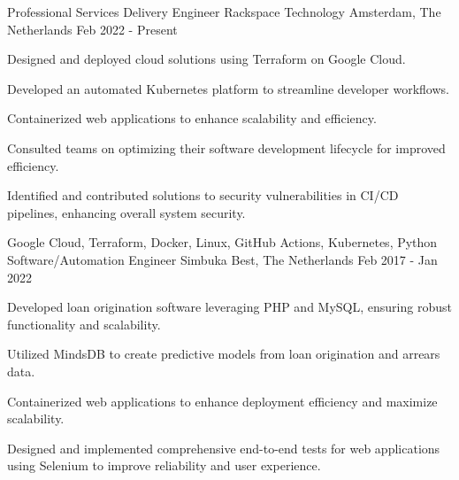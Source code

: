 

\begin{cventries}

  \cventry
    {Professional Services Delivery Engineer} %
    {Rackspace Technology} %
    {Amsterdam, The Netherlands} %
    {Feb 2022 - Present} %
    {
      \begin{cvitems} %
        \item {Designed and deployed cloud solutions using Terraform on Google Cloud.}
        \item {Developed an automated Kubernetes platform to streamline developer workflows.}
        \item {Containerized web applications to enhance scalability and efficiency.}
        \item {Consulted teams on optimizing their software development lifecycle for improved efficiency.}
        \item {Identified and contributed solutions to security vulnerabilities in CI/CD pipelines, enhancing overall system security.}
      \end{cvitems}
    }
    {Google Cloud, Terraform, Docker, Linux, GitHub Actions, Kubernetes, Python}
  \cventry
    {Software/Automation Engineer} %
    {Simbuka} %
    {Best, The Netherlands} %
    {Feb 2017 - Jan 2022} %
    {
      \begin{cvitems} %
        \item {Developed loan origination software leveraging PHP and MySQL, ensuring robust functionality and scalability.}
        \item {Utilized MindsDB to create predictive models from loan origination and arrears data.}
        \item {Containerized web applications to enhance deployment efficiency and maximize scalability.}
        \item {Designed and implemented comprehensive end-to-end tests for web applications using Selenium to improve reliability and user experience.}

\end{cvitems}}
\end{cventries}
